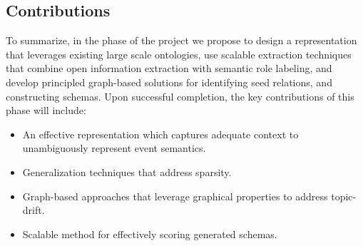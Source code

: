 \subsection{Contributions}

To summarize, in the phase of the project we propose to design a representation that leverages existing large scale ontologies, use scalable extraction techniques that combine open information extraction with semantic role labeling, and develop principled graph-based solutions for identifying seed relations, and constructing schemas. Upon successful completion, the key contributions of this phase will include:
\begin{itemize}
\item An effective representation which captures adequate context to unambiguously represent event semantics. 
\item Generalization techniques that address sparsity. 
\item Graph-based approaches that leverage graphical properties to address topic-drift. 
\item Scalable method for effectively scoring generated schemas. 
\end{itemize}

